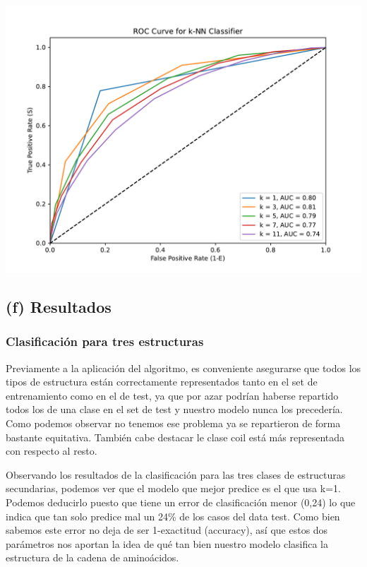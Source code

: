 \documentclass[
]{article}
\begin{document}
\includegraphics{code_files/figure-latex/unnamed-chunk-9-1.pdf}

\hypertarget{f-resultados}{%
\subsection{(f) Resultados}\label{f-resultados}}

\hypertarget{clasificaciuxf3n-para-tres-estructuras}{%
\subsubsection{Clasificación para tres
estructuras}\label{clasificaciuxf3n-para-tres-estructuras}}

Previamente a la aplicación del algoritmo, es conveniente asegurarse que
todos los tipos de estructura están correctamente representados tanto en
el set de entrenamiento como en el de test, ya que por azar podrían
haberse repartido todos los de una clase en el set de test y nuestro
modelo nunca los precedería. Como podemos observar no tenemos ese
problema ya se repartieron de forma bastante equitativa. También cabe
destacar le clase coil está más representada con respecto al resto.

Observando los resultados de la clasificación para las tres clases de
estructuras secundarias, podemos ver que el modelo que mejor predice es
el que usa k=1. Podemos deducirlo puesto que tiene un error de
clasificación menor (0,24) lo que indica que tan solo predice mal un
24\% de los casos del data test. Como bien sabemos este error no deja de
ser 1-exactitud (accuracy), así que estos dos parámetros nos aportan la
idea de qué tan bien nuestro modelo clasifica la estructura de la cadena
de aminoácidos.
\end{document}
